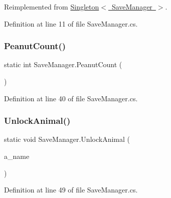 Reimplemented from \mbox{\hyperlink{class_singleton_aac558b29781a363c0845b0359c8f85ff}{Singleton$<$ Save\+Manager $>$}}.



Definition at line 11 of file Save\+Manager.\+cs.

\mbox{\label{class_save_manager_a8f9d8e15152684f6f05b980ac9adf7e1}} 
\subsubsection{\texorpdfstring{Peanut\+Count()}{PeanutCount()}}
{\footnotesize\ttfamily static int Save\+Manager.\+Peanut\+Count (\begin{DoxyParamCaption}{ }\end{DoxyParamCaption})\hspace{0.3cm}{\ttfamily [static]}}



Definition at line 40 of file Save\+Manager.\+cs.

\mbox{\label{class_save_manager_ae067ae14a03adf8f77fb7c5077d84493}} 
\subsubsection{\texorpdfstring{Unlock\+Animal()}{UnlockAnimal()}}
{\footnotesize\ttfamily static void Save\+Manager.\+Unlock\+Animal (\begin{DoxyParamCaption}\item[{\mbox{\hyperlink{_animal_8cs_a2fa5713399b84d1b88dae9196837af50}{A\+N\+I\+M\+A\+L\+\_\+\+N\+A\+ME}}}]{a\+\_\+name }\end{DoxyParamCaption})\hspace{0.3cm}{\ttfamily [static]}}



Definition at line 49 of file Save\+Manager.\+cs.

\mbox{\label{class_save_manager_a15d355ec35b09a7b73996d8e11bc11eb}} 
